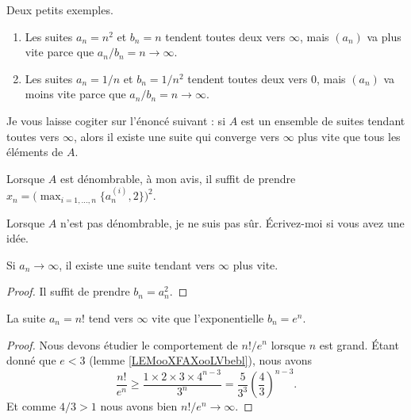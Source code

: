 \begin{example}
	Deux petits exemples.
	\begin{enumerate}
		\item
		      Les suites \( a_n=n^2\) et \( b_n=n\) tendent toutes deux vers \( \infty\), mais \( (a_n)\) va plus vite parce que \( a_n/b_n=n\to \infty\).
		\item
		      Les suites \( a_n=1/n\) et \( b_n=1/n^2\) tendent toutes deux vers \( 0\), mais \( (a_n)\) va moins vite parce que \( a_n/b_n=n\to\infty\).
	\end{enumerate}
\end{example}


\begin{normaltext}
	Je vous laisse cogiter sur l'énoncé suivant : si \( A\) est un ensemble de suites tendant toutes vers \( \infty\), alors il existe une suite qui converge vers \( \infty\) plus vite que tous les éléments de \( A\).

	Lorsque \( A\) est dénombrable, à mon avis, il suffit de prendre \( x_n=\big(  \max_{i=1,\ldots,n}\{ a^{(i)}_n,2 \} \big)^2 \).

	Lorsque \( A\) n'est pas dénombrable, je ne suis pas sûr. Écrivez-moi si vous avez une idée.
\end{normaltext}

\begin{lemma}
	Si \( a_n\to \infty\), il existe une suite tendant vers \( \infty\) plus vite.
\end{lemma}

\begin{proof}
	Il suffit de prendre \( b_n=a_n^2\).
\end{proof}

\begin{lemma}
	La suite \( a_n=n!\) tend vers \( \infty\) vite que l'exponentielle \( b_n=e^n\).
\end{lemma}

\begin{proof}
	Nous devons étudier le comportement de \( n!/e^n\) lorsque \( n\) est grand. Étant donné que \( e<3\) (lemme \ref{LEMooXFAXooLVbebl}), nous avons
	\begin{equation}
		\frac{ n! }{ e^n }\geq \frac{ 1\times 2\times 3\times 4^{n-3} }{ 3^n }=\frac{ 5 }{ 3^3 }\left( \frac{ 4 }{ 3 } \right)^{n-3}.
	\end{equation}
	Et comme \( 4/3>1\) nous avons bien \( n!/e^n\to\infty\).
\end{proof}


